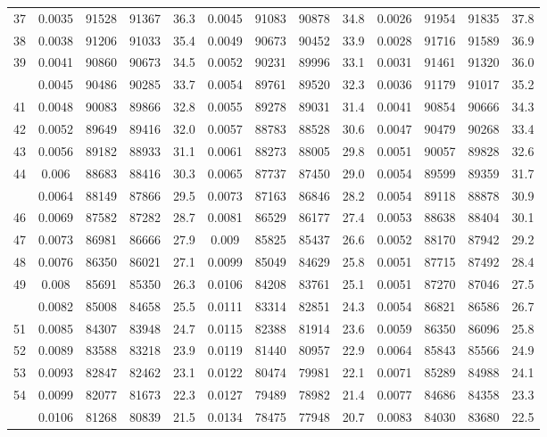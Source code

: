 \documentclass[
  14pt,
]{article}
\begin{document}
\begin{longtable}[t]{lcccccccccccc}
37 & 0.0035 & 91528 & 91367 & 36.3 & 0.0045 & 91083 & 90878 & 34.8 & 0.0026 & 91954 & 91835 & 37.8\\
38 & 0.0038 & 91206 & 91033 & 35.4 & 0.0049 & 90673 & 90452 & 33.9 & 0.0028 & 91716 & 91589 & 36.9\\
39 & 0.0041 & 90860 & 90673 & 34.5 & 0.0052 & 90231 & 89996 & 33.1 & 0.0031 & 91461 & 91320 & 36.0\\
\addlinespace
40 & 0.0045 & 90486 & 90285 & 33.7 & 0.0054 & 89761 & 89520 & 32.3 & 0.0036 & 91179 & 91017 & 35.2\\
41 & 0.0048 & 90083 & 89866 & 32.8 & 0.0055 & 89278 & 89031 & 31.4 & 0.0041 & 90854 & 90666 & 34.3\\
42 & 0.0052 & 89649 & 89416 & 32.0 & 0.0057 & 88783 & 88528 & 30.6 & 0.0047 & 90479 & 90268 & 33.4\\
43 & 0.0056 & 89182 & 88933 & 31.1 & 0.0061 & 88273 & 88005 & 29.8 & 0.0051 & 90057 & 89828 & 32.6\\
44 & 0.006 & 88683 & 88416 & 30.3 & 0.0065 & 87737 & 87450 & 29.0 & 0.0054 & 89599 & 89359 & 31.7\\
\addlinespace
45 & 0.0064 & 88149 & 87866 & 29.5 & 0.0073 & 87163 & 86846 & 28.2 & 0.0054 & 89118 & 88878 & 30.9\\
46 & 0.0069 & 87582 & 87282 & 28.7 & 0.0081 & 86529 & 86177 & 27.4 & 0.0053 & 88638 & 88404 & 30.1\\
47 & 0.0073 & 86981 & 86666 & 27.9 & 0.009 & 85825 & 85437 & 26.6 & 0.0052 & 88170 & 87942 & 29.2\\
48 & 0.0076 & 86350 & 86021 & 27.1 & 0.0099 & 85049 & 84629 & 25.8 & 0.0051 & 87715 & 87492 & 28.4\\
49 & 0.008 & 85691 & 85350 & 26.3 & 0.0106 & 84208 & 83761 & 25.1 & 0.0051 & 87270 & 87046 & 27.5\\
\addlinespace
50 & 0.0082 & 85008 & 84658 & 25.5 & 0.0111 & 83314 & 82851 & 24.3 & 0.0054 & 86821 & 86586 & 26.7\\
51 & 0.0085 & 84307 & 83948 & 24.7 & 0.0115 & 82388 & 81914 & 23.6 & 0.0059 & 86350 & 86096 & 25.8\\
52 & 0.0089 & 83588 & 83218 & 23.9 & 0.0119 & 81440 & 80957 & 22.9 & 0.0064 & 85843 & 85566 & 24.9\\
53 & 0.0093 & 82847 & 82462 & 23.1 & 0.0122 & 80474 & 79981 & 22.1 & 0.0071 & 85289 & 84988 & 24.1\\
54 & 0.0099 & 82077 & 81673 & 22.3 & 0.0127 & 79489 & 78982 & 21.4 & 0.0077 & 84686 & 84358 & 23.3\\
\addlinespace
55 & 0.0106 & 81268 & 80839 & 21.5 & 0.0134 & 78475 & 77948 & 20.7 & 0.0083 & 84030 & 83680 & 22.5\\

\end{longtable}
\end{document}
